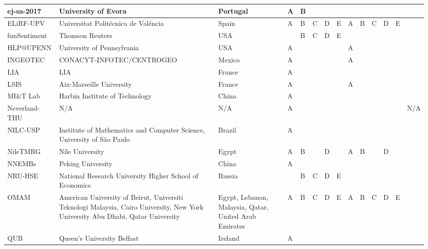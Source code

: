 \begin{table}[h!]
\begin{scriptsize}
\begin{tabular}{|l|p{4.5cm}|p{1.8cm} | lllll | lllll |p{3.8cm}|}
\hline
ej-sa-2017	&	University of Evora	&	Portugal	&	A	&	B	&		&		&		&		&		&		&		&		&	\cite{SemEval:2017:task4:ej-sa-2017} \\
\hline
ELiRF-UPV	&	Universitat Polit\'{e}cnica de Val\'{e}ncia	&	Spain	&	A	&	B	&	C	&	D	&	E	&	A	&	B	&	C	&	D	&	E	&	\cite{SemEval:2017:task4:elirf-upv} \\
\hline
funSentiment	&	Thomson Reuters	&	USA	&			&	B	&	C	&	D	&	E	&	& 		&		&		&		&	\cite{SemEval:2017:task4:funsentiment}	\\
\hline
HLP@UPENN	&	University of Pennsylvania	&	USA	&	A	&		&		&		&		&	A	&		&		&		&		&	\cite{SemEval:2017:task4:hlp@upenn} \\
\hline
INGEOTEC	&	CONACYT-INFOTEC/CENTROGEO	&	Mexico	&	A	&		&		&		&		&	A	&		&		&		&		&	\cite{SemEval:2017:task4:ingeotec} \\
\hline
LIA	&	LIA	&	France	&	A	&		&		&		&		&		&		&		&		&		&	\cite{SemEval:2017:task4:lia} \\
\hline
LSIS	&	Aix-Marseille University	&	France	&	A	&		&		&		&		&	A	&		&		&		&		&	\cite{SemEval:2017:task4:lsis}	\\
\hline
MI\&T Lab	&	Harbin Institute of Technology	&	China	&	A	&		&		&		&		&		&		&		&		&		&	\cite{SemEval:2017:task4:mitlab} \\
\hline
Neverland-THU	&	N/A	&	N/A	&	A	&		&		&		&		& 		&		&		&		&		&	N/A	\\
\hline
NILC-USP	&	Institute of Mathematics and Computer Science, University of São Paulo	&	Brazil	&	A	&		&		&		&		&		&		&		&		&		&	\cite{SemEval:2017:task4:nilc-usp}\\
\hline
NileTMRG	&	Nile University	&	Egypt	&	A	&	B	&		&	D	&		&	A	&	B	&		&	D	&		&	\cite{SemEval:2017:task4:niletmrg} \\
\hline
NNEMBs	&	Peking University	&	China	&	A	&		&		&		&		&		&		&		&		&		&	\cite{SemEval:2017:task4:nnembs} \\
\hline
NRU-HSE	&	National Research University Higher School of Economics	&	Russia	&		&	B	&	C	&	D	&	E	&		&		&		&		&		&	\cite{SemEval:2017:task4:nru-hse} \\
\hline
OMAM	&	American University of Beirut, Universiti Teknologi Malaysia, Cairo University, New York University Abu Dhabi, Qatar University	&	Egypt, Lebanon, Malaysia, Qatar, United Arab Emirates	&	A	&	B	&	C	&	D	&	E	&	A	&	B	&	C	&	D	&	E	&	\cite{SemEval:2017:task4:omam,SemEval:2017:task4:omam2} \\
\hline
QUB	&	Queen's University Belfast	&	Ireland	&	A	&		&		&		&		&		&		&		&		&		&		\\
\hline

\end{tabular}
\end{scriptsize}
\end{table}
